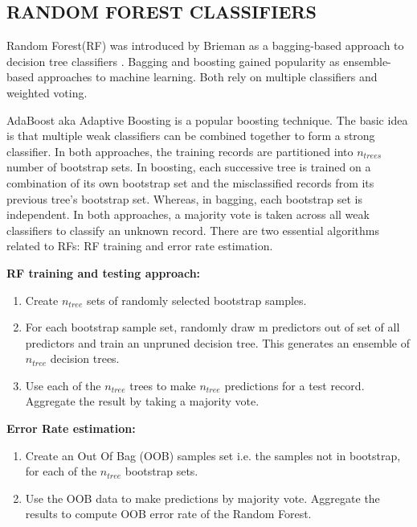 	\subsection{RANDOM FOREST CLASSIFIERS}
	Random Forest(RF) was introduced by Brieman as a bagging-based approach to decision tree classifiers \cite{rf1, rf2}. Bagging and boosting gained popularity as ensemble-based approaches to machine learning. Both rely on multiple classifiers and weighted voting. \par
	AdaBoost aka Adaptive Boosting is a popular boosting technique. The basic idea is that multiple weak classifiers can be combined together to form a strong classifier. In both approaches, the training records are partitioned into $n_{trees}$ number of bootstrap sets. In boosting, each successive tree is trained on a combination of its own bootstrap set and the misclassified records from its previous tree’s bootstrap set. Whereas, in bagging, each bootstrap set is independent. In both approaches, a majority vote is taken across all weak classifiers to classify an unknown record.
	There are two essential algorithms related to RFs: RF training and error rate estimation.
	
	\textbf{RF training and testing approach:}
	\begin{enumerate}
	\item Create $n_{tree}$ sets of randomly selected bootstrap samples.
	\item For each bootstrap sample set, randomly draw m predictors out of set of all predictors and train an unpruned decision tree. This generates an ensemble of $n_{tree}$ decision trees.
	\item Use each of the $n_{tree}$ trees to make $n_{tree}$ predictions for a test record. Aggregate the result by taking a majority vote.
	\end{enumerate}

	\textbf{Error Rate estimation:}
	\begin{enumerate}
	\item Create an Out Of Bag (OOB) samples set i.e. the samples not in bootstrap, for each of the $n_{tree}$ bootstrap sets. 
	\item Use the OOB data to make predictions by majority vote. Aggregate the results to compute OOB error rate of the Random Forest.
	\end{enumerate}
	
